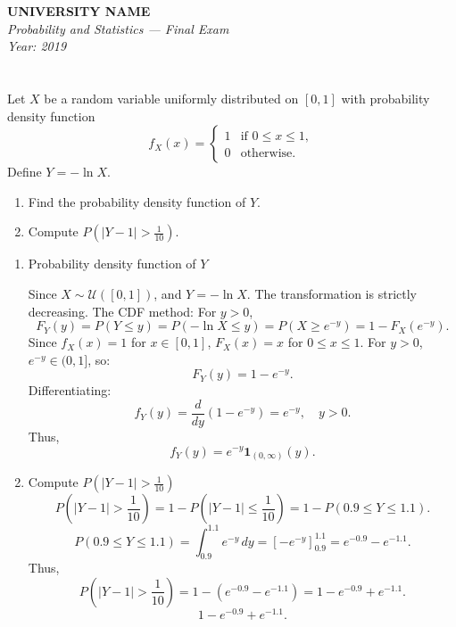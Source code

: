 \documentclass[12pt]{article}
\begin{document}
\begin{center}
  \Large\textbf{UNIVERSITY NAME} \\[1em]
  \large\textit{Probability and Statistics — Final Exam} \\[0.5em]
  \large\textit{Year: 2019} \\[2em]
\end{center}

\vspace{0.5cm}

\section{}
Let \( X \) be a random variable uniformly distributed on \([0,1]\) with probability density function  
\[
f_X(x) = 
\begin{cases} 
1 & \text{if } 0 \leq x \leq 1, \\
0 & \text{otherwise.}
\end{cases}
\]  
Define \( Y = -\ln X \).

\begin{enumerate}
    \item Find the probability density function of \( Y \).
    \item Compute \( P\left( |Y - 1| > \frac{1}{10} \right) \).
\end{enumerate}

\begin{answerbox}
\begin{enumerate}
  \item Probability density function of \( Y \)

Since \( X \sim \mathcal{U}([0,1]) \), and \( Y = -\ln X \). The transformation is strictly decreasing.
The CDF method:
For \( y > 0 \),
\[
F_Y(y) = P(Y \le y) = P(-\ln X \le y) = P(X \ge e^{-y}) = 1 - F_X(e^{-y}).
\]
Since \( f_X(x)=1 \) for \( x \in [0,1] \), \( F_X(x) = x \) for \( 0 \le x \le 1 \). For \( y>0 \), \( e^{-y} \in (0,1] \), so:
\[
F_Y(y) = 1 - e^{-y}.
\]
Differentiating:
\[
f_Y(y) = \frac{d}{dy}(1 - e^{-y}) = e^{-y}, \quad y > 0.
\]
Thus,
\[
\boxed{f_Y(y) = e^{-y} \mathbf{1}_{(0,\infty)}(y)}.
\]

\item Compute \( P\left( |Y - 1| > \frac{1}{10} \right) \)
\[
P\left( |Y - 1| > \frac{1}{10} \right) = 1 - P\left( |Y - 1| \le \frac{1}{10} \right) = 1 - P\left( 0.9 \le Y \le 1.1 \right).
\]
\[
P(0.9 \le Y \le 1.1) = \int_{0.9}^{1.1} e^{-y} \, dy = \left[ -e^{-y} \right]_{0.9}^{1.1} = e^{-0.9} - e^{-1.1}.
\]
Thus,
\[
P\left( |Y - 1| > \frac{1}{10} \right) = 1 - \left( e^{-0.9} - e^{-1.1} \right) = 1 - e^{-0.9} + e^{-1.1}.
\]
\[
\boxed{1 - e^{-0.9} + e^{-1.1}}.
\]
\end{enumerate}
\end{answerbox}
\end{document}
